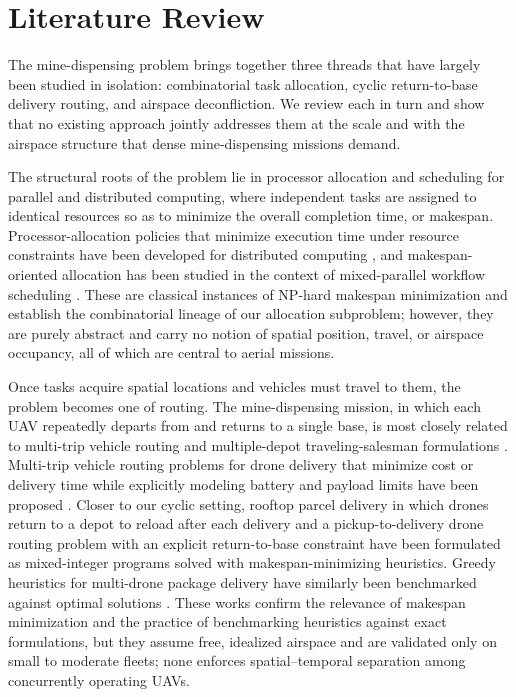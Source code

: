 \documentclass[subscriptcorrection,upint,nolists, varvw,barcolor=Goldenrod3,mathalfa=cal=euler,balance,hyphenate,french]{asmejour} %
\begin{document}
\section{Literature Review}

The mine-dispensing problem brings together three threads that have largely been studied in isolation: combinatorial task allocation, cyclic return-to-base delivery routing, and airspace deconfliction. We review each in turn and show that no existing approach jointly addresses them at the scale and with the airspace structure that dense mine-dispensing missions demand.

The structural roots of the problem lie in processor allocation and scheduling for parallel and distributed computing, where independent tasks are assigned to identical resources so as to minimize the overall completion time, or makespan. Processor-allocation policies that minimize execution time under resource constraints have been developed for distributed computing \cite{Corbalan2005, Li2005}, and makespan-oriented allocation has been studied in the context of mixed-parallel workflow scheduling \cite{Huang2016}. These are classical instances of NP-hard makespan minimization and establish the combinatorial lineage of our allocation subproblem; however, they are purely abstract and carry no notion of spatial position, travel, or airspace occupancy, all of which are central to aerial missions.

Once tasks acquire spatial locations and vehicles must travel to them, the problem becomes one of routing. The mine-dispensing mission, in which each UAV repeatedly departs from and returns to a single base, is most closely related to multi-trip vehicle routing and multiple-depot traveling-salesman formulations \cite{Assaf2017}. Multi-trip vehicle routing problems for drone delivery that minimize cost or delivery time while explicitly modeling battery and payload limits have been proposed \cite{Dorling2017}. Closer to our cyclic setting, rooftop parcel delivery in which drones return to a depot to reload after each delivery \cite{Kim2020} and a pickup-to-delivery drone routing problem with an explicit return-to-base constraint \cite{GomezLagos2022} have been formulated as mixed-integer programs solved with makespan-minimizing heuristics. Greedy heuristics for multi-drone package delivery have similarly been benchmarked against optimal solutions \cite{BettiSorbelli2022}. These works confirm the relevance of makespan minimization and the practice of benchmarking heuristics against exact formulations, but they assume free, idealized airspace and are validated only on small to moderate fleets; none enforces spatial--temporal separation among concurrently operating UAVs.
\end{document}
